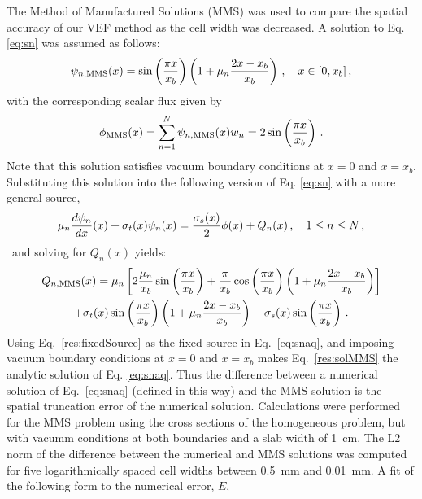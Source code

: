 The Method of Manufactured Solutions (MMS) was used to compare the spatial accuracy of our VEF method as the cell width was decreased. A solution to Eq. \ref{eq:sn} was assumed as follows: 
		\begin{equation} \label{res:solMMS}
			\psi_{n,\text{MMS}}(x) = \sin\left(\frac{\pi x}{x_b}\right) \left(1 + \mu_n \frac{2x - x_b}{x_b}\right) \,, \quad x\in[0,x_b] \,, 
		\end{equation}
with the corresponding scalar flux given by
		\begin{equation}
			\phi_\text{MMS}(x) = \sum_{n=1}^N \psi_{n,\text{MMS}}(x) w_n = 2 \sin\left(\frac{\pi x}{x_b}\right) \,.
		\end{equation}
Note that this solution satisfies vacuum boundary conditions at $x=0$ and $x=x_b$.
Substituting this solution into the following version of Eq. \ref{eq:sn} with a more general source,
	\begin{equation} \label{eq:snaq}
		\mu_n \frac{d \psi_n}{d x}(x) + \sigma_t(x) \psi_n(x) = 
		\frac{\sigma_s(x)}{2} \phi(x) +  Q_n(x) \,, \quad 1 \leq n \leq N \,,
	\end{equation}\
and solving for $Q_n(x)$ yields:
	\begin{multline} \label{res:fixedSource}
		Q_{n,\text{MMS}}(x) = 
			\mu_n\left[ 2\frac{\mu_n}{x_b}\sin\left(\frac{\pi x}{x_b}\right) + 
				\frac{\pi}{x_b}\cos\left(\frac{\pi x}{x_b}\right)\left(1 + \mu_n \frac{2x-x_b}{x_b}\right) \right]
				\\+ \sigma_t(x)\sin\left(\frac{\pi x}{x_b}\right)\left(1 + \mu_n \frac{2x - x_b}{x_b}\right) - \sigma_s(x) \sin\left(\frac{\pi x}{x_b}\right) \,.
	\end{multline}
Using Eq.~\ref{res:fixedSource} as the fixed source in Eq.~\ref{eq:snaq}, and imposing 
vacuum boundary conditions at $x=0$ and $x=x_b$ makes Eq.~\ref{res:solMMS} the 
analytic solution of Eq. \ref{eq:snaq}.  Thus the difference between a numerical 
solution of Eq.~\ref{eq:snaq} (defined in this way) and the MMS solution is the spatial truncation error of the numerical solution.  
Calculations were performed for the MMS problem using the cross sections of the homogeneous 
problem, but with vacumm conditions at both boundaries and a slab width of \SI{1}{cm}.
The L2 norm of the difference between the numerical and MMS solutions was computed for five logarithmically spaced cell widths between \SI{0.5}{mm} and \SI{0.01}{mm}.  A fit of the following form to the numerical error, $E$,  
